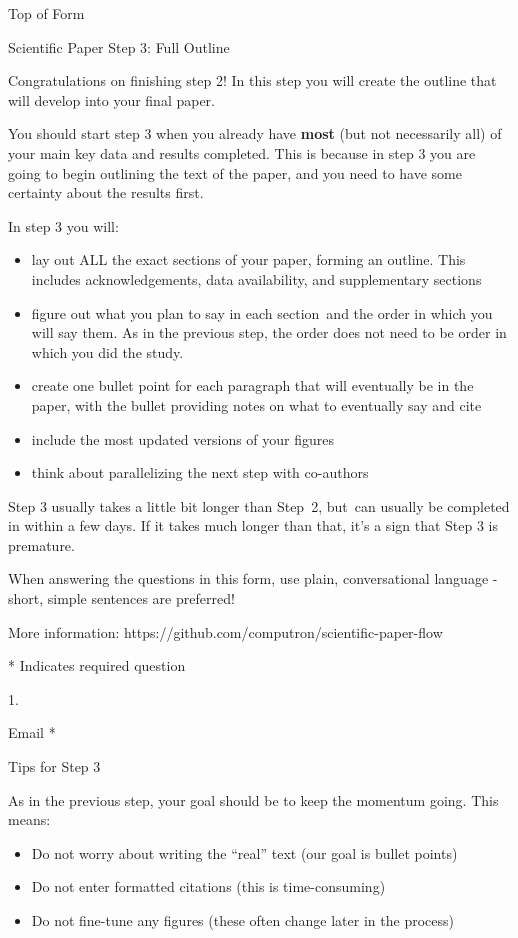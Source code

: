 \documentclass[]{article}
\date{}
\begin{document}
Top of Form

Scientific Paper Step 3: Full Outline

Congratulations on finishing step 2! In this step you will create the
outline that will develop into your final paper.

You should start step 3 when you already have \textbf{most} (but not
necessarily all) of your main key data and results completed. This is
because in step 3 you are going to begin outlining the text of the
paper, and you need to have some certainty about the results first.

In step 3 you will:

\begin{itemize}
\item
  lay out ALL the exact sections of your paper, forming an outline. This
  includes acknowledgements, data availability, and supplementary
  sections
\item
  figure out what you plan to say in each section~and the order in which
  you will say them. As in the previous step, the order does not need to
  be order in which you did the study.
\item
  create one bullet point for each paragraph that will eventually be in
  the paper, with the bullet providing notes on what to eventually say
  and cite
\item
  include the most updated versions of your figures
\item
  think about parallelizing the next step with co-authors
\end{itemize}

Step 3 usually takes a little bit longer than Step~2, but~can usually be
completed in within a few days. If it takes much longer than that, it's
a sign that Step 3 is premature.~

When answering the questions in this form, use plain, conversational
language - short, simple sentences are preferred!

More information: https://github.com/computron/scientific-paper-flow

* Indicates required question

1.

Email *

Tips for Step 3

As in the previous step, your goal should be to keep the momentum going.
This means:

\begin{itemize}
\item
  Do not worry about writing the ``real'' text (our goal is bullet
  points)
\item
  Do not enter formatted citations (this is time-consuming)
\item
  Do not fine-tune any figures (these often change later in the process)
\end{itemize}
\end{document}

